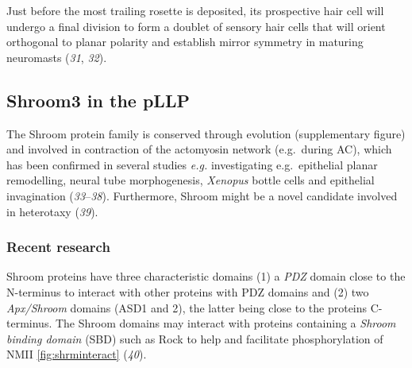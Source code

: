 \documentclass[11pt,singlespacinge,twoside]{reedthesis} %
\begin{document}
Just before the most trailing rosette is deposited, its prospective hair cell will undergo a final division to form a doublet of sensory hair cells that will orient orthogonal to planar polarity and establish mirror symmetry in maturing neuromasts (\emph{31}, \emph{32}).

\hypertarget{shroom3-in-the-pllp}{%
\subsection{Shroom3 in the pLLP}\label{shroom3-in-the-pllp}}

The Shroom protein family is conserved through evolution (supplementary figure) and involved in contraction of the actomyosin network (e.g.~during AC), which has been confirmed in several studies \emph{e.g.} investigating e.g.~epithelial planar remodelling, neural tube morphogenesis, \emph{Xenopus} bottle cells and epithelial invagination (\emph{33}--\emph{38}). Furthermore, Shroom might be a novel candidate involved in heterotaxy (\emph{39}).

\hypertarget{intro-shroom}{%
\subsubsection{Recent research}\label{intro-shroom}}

Shroom proteins have three characteristic domains (1) a \emph{PDZ} domain close to the N-terminus to interact with other proteins with PDZ domains and (2) two \emph{Apx/Shroom} domains (ASD1 and 2), the latter being close to the proteins C-terminus. The Shroom domains may interact with proteins containing a \emph{Shroom binding domain} (SBD) such as Rock to help and facilitate phosphorylation of NMII \ref{fig:shrminteract} (\emph{40}).
\end{document}

